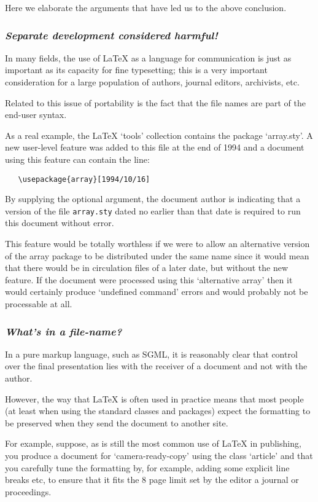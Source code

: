 \documentclass{ltxguide}[1995/11/28]
\newcommand{\reasonsection}[1]{\subsubsection*{\it #1}}
\begin{document}
Here we elaborate the arguments that have led us to the above
conclusion.


\reasonsection{Separate development considered harmful!}
\label{sec:ja}

In many fields, the use of \LaTeX{} as a language for communication
is just as important as its capacity for fine typesetting; this is a
very important consideration for a large population of authors,
journal editors, archivists, etc.

Related to this issue of portability is the fact that the file names
are part of the end-user syntax.

As a real example, the \LaTeX{} `tools' collection contains the
package `array.sty'.  A new user-level feature was added to this file
at the end of 1994 and a document using this feature can contain the
line:
\begin{verbatim}
   \usepackage{array}[1994/10/16]
\end{verbatim}

By supplying the optional argument, the document author is indicating
that a version of the file \texttt{array.sty} dated no earlier than
that date is required to run this document without error.

This feature would be totally worthless if we were to allow an
alternative version of the array package to be distributed under the
same name since it would mean that there would be in circulation files
of a later date, but without the new feature.  If the document
were processed using this `alternative array' then it would certainly
produce `undefined command' errors and would probably not be
processable at all.


\reasonsection{What's in a file-name?}
\label{sec:jb}

In a pure markup language, such as SGML, it is reasonably clear that
control over the final presentation lies with the receiver of a
document and not with the author.

However, the way that \LaTeX{} is often used in practice means that
most people (at least when using the standard classes and packages)
expect the formatting to be preserved when they send the document to
another site.

For example, suppose, as is still the most common use of \LaTeX{} in
publishing, you produce a document for `camera-ready-copy' using the
class `article' and that you carefully tune the formatting by, for
example, adding some explicit line breaks etc, to ensure that it fits
the 8 page limit set by the editor a journal or proceedings.
\end{document}
